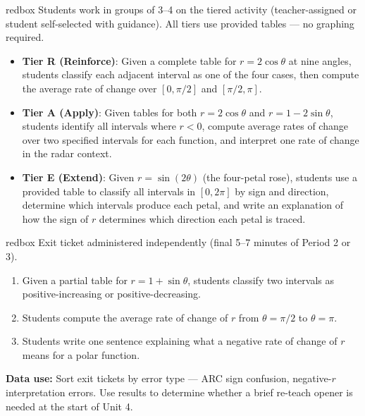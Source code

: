 \documentclass[10pt]{article}
\begin{document}
\vspace{0.08in}

\begin{skillbox}{redbox}
Students work in groups of 3--4 on the tiered activity (teacher-assigned
or student self-selected with guidance). All tiers use provided tables ---
no graphing required.

\begin{itemize}[leftmargin=1.4em, itemsep=4pt]
  \item \textbf{Tier R (Reinforce)}: Given a complete table for $r = 2\cos\theta$
    at nine angles, students classify each adjacent interval as one of the four
    cases, then compute the average rate of change over $[0, \pi/2]$ and
    $[\pi/2, \pi]$.
  \item \textbf{Tier A (Apply)}: Given tables for both $r = 2\cos\theta$ and
    $r = 1 - 2\sin\theta$, students identify all intervals where $r < 0$, compute
    average rates of change over two specified intervals for each function, and
    interpret one rate of change in the radar context.
  \item \textbf{Tier E (Extend)}: Given $r = \sin(2\theta)$ (the four-petal rose),
    students use a provided table to classify all intervals in $[0, 2\pi]$ by sign
    and direction, determine which intervals produce each petal, and write an
    explanation of how the sign of $r$ determines which direction each petal is traced.
\end{itemize}
\end{skillbox}

\vspace{0.08in}

\begin{skillbox}{redbox}
Exit ticket administered independently (final 5--7 minutes of Period 2 or 3).

\begin{enumerate}[leftmargin=1.4em, itemsep=4pt]
  \item Given a partial table for $r = 1 + \sin\theta$, students classify two
    intervals as positive-increasing or positive-decreasing.
  \item Students compute the average rate of change of $r$ from $\theta = \pi/2$
    to $\theta = \pi$.
  \item Students write one sentence explaining what a negative rate of change of
    $r$ means for a polar function.
\end{enumerate}

\textbf{Data use:} Sort exit tickets by error type --- ARC sign confusion,
negative-$r$ interpretation errors. Use results to determine whether a
brief re-teach opener is needed at the start of Unit 4.
\end{skillbox}
\end{document}
